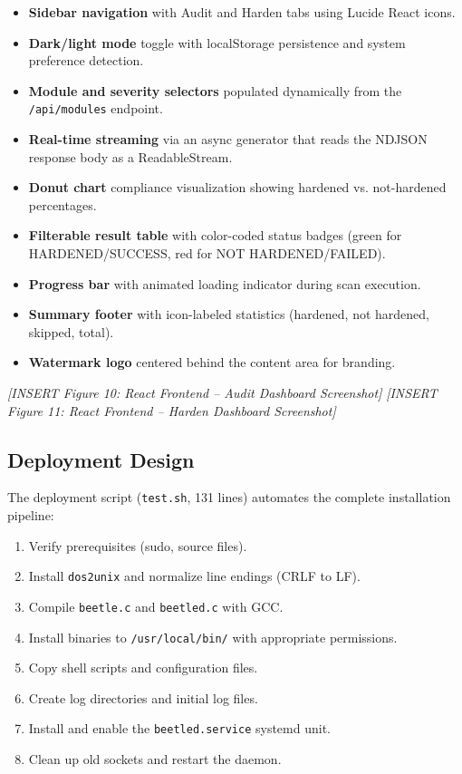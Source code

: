 \begin{itemize}[noitemsep]
    \item \textbf{Sidebar navigation} with Audit and Harden tabs using Lucide React icons.
    \item \textbf{Dark/light mode} toggle with localStorage persistence and system preference detection.
    \item \textbf{Module and severity selectors} populated dynamically from the \texttt{/api/modules} endpoint.
    \item \textbf{Real-time streaming} via an async generator that reads the NDJSON response body as a ReadableStream.
    \item \textbf{Donut chart} compliance visualization showing hardened vs. not-hardened percentages.
    \item \textbf{Filterable result table} with color-coded status badges (green for HARDENED/SUCCESS, red for NOT HARDENED/FAILED).
    \item \textbf{Progress bar} with animated loading indicator during scan execution.
    \item \textbf{Summary footer} with icon-labeled statistics (hardened, not hardened, skipped, total).
    \item \textbf{Watermark logo} centered behind the content area for branding.
\end{itemize}

\vspace{0.5cm}
\noindent\textit{[INSERT Figure 10: React Frontend -- Audit Dashboard Screenshot]}
\vspace{0.5cm}
\noindent\textit{[INSERT Figure 11: React Frontend -- Harden Dashboard Screenshot]}
\vspace{0.5cm}

\subsection{Deployment Design}

The deployment script (\texttt{test.sh}, 131 lines) automates the complete installation pipeline:

\begin{enumerate}[noitemsep]
    \item Verify prerequisites (sudo, source files).
    \item Install \texttt{dos2unix} and normalize line endings (CRLF to LF).
    \item Compile \texttt{beetle.c} and \texttt{beetled.c} with GCC.
    \item Install binaries to \texttt{/usr/local/bin/} with appropriate permissions.
    \item Copy shell scripts and configuration files.
    \item Create log directories and initial log files.
    \item Install and enable the \texttt{beetled.service} systemd unit.
    \item Clean up old sockets and restart the daemon.
\end{enumerate}

